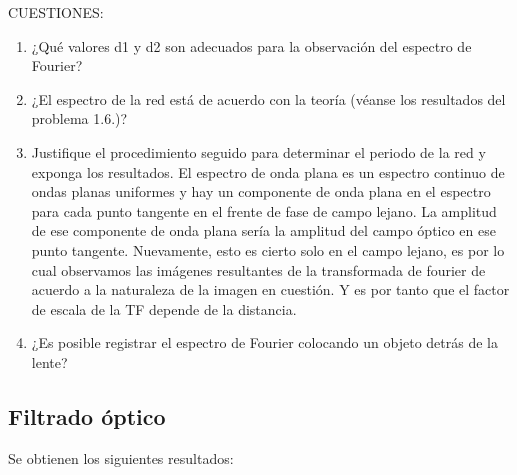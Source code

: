 \documentclass{./packages/optica-article}
\begin{document}
CUESTIONES:
\begin{enumerate}
    \item ¿Qué valores d1 y d2 son adecuados para la observación del espectro de Fourier?
    \item ¿El espectro de la red está de acuerdo con la teoría (véanse los resultados del problema 1.6.)?
    \item Justifique el procedimiento seguido para determinar el periodo de la red y exponga los resultados.
    El espectro de onda plana es un espectro continuo de ondas planas uniformes y hay un componente de onda plana en el espectro para cada punto tangente en el frente de fase de campo lejano. La amplitud de ese componente de onda plana sería la amplitud del campo óptico en ese punto tangente. Nuevamente, esto es cierto solo en el campo lejano, es por lo cual observamos las imágenes resultantes de la transformada de fourier de acuerdo a la naturaleza de la imagen en cuestión. Y es por tanto que el factor de escala de la TF depende de la distancia.
    \item ¿Es posible registrar el espectro de Fourier colocando un objeto detrás de la lente?
\end{enumerate}


\subsection{Filtrado óptico}
Se obtienen los siguientes resultados:
\end{document}

